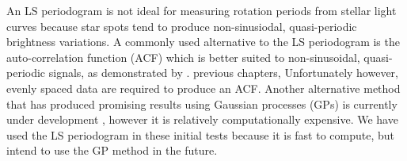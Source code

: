 An LS periodogram is not ideal for measuring rotation periods from stellar
light curves because star spots tend to produce non-sinusiodal, quasi-periodic
brightness variations.
A commonly used alternative to the LS periodogram is the auto-correlation
function (ACF) which is better suited to non-sinusoidal, quasi-periodic
signals, as demonstrated by \citet{Mcquillan2013}.
previous chapters,
Unfortunately however, evenly spaced data are required to produce an ACF.
Another alternative method that has produced promising results using Gaussian
processes (GPs) is currently under development \citep{Angus2015b}, however it
is relatively computationally expensive.
We have used the LS periodogram in these initial tests because it is fast to
compute, but intend to use the GP method in the future.





